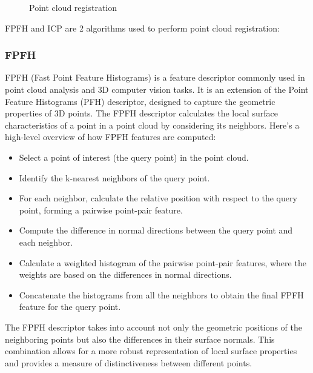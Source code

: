 \documentclass{article}
\begin{document}
	\begin{figure}[H]
		\centering
		\caption{Point cloud registration}
		\label{fig:pointcloud-align}
	\end{figure}
	
	FPFH and ICP are 2 algorithms used to perform point cloud registration:
	
	\subsubsection{FPFH}
	
	FPFH (Fast Point Feature Histograms) is a feature descriptor commonly used in point cloud analysis and 3D computer vision tasks. It is an extension of the Point Feature Histograms (PFH) descriptor, designed to capture the geometric properties of 3D points. The FPFH descriptor calculates the local surface characteristics of a point in a point cloud by considering its neighbors. Here's a high-level overview of how FPFH features are computed:
	\begin{itemize}
		\item Select a point of interest (the query point) in the point cloud.
		\item Identify the k-nearest neighbors of the query point.
		\item For each neighbor, calculate the relative position with respect to the query point, forming a pairwise point-pair feature.
		\item Compute the difference in normal directions between the query point and each neighbor.
		\item Calculate a weighted histogram of the pairwise point-pair features, where the weights are based on the differences in normal directions.
		\item Concatenate the histograms from all the neighbors to obtain the final FPFH feature for the query point.
	\end{itemize}
	
	The FPFH descriptor takes into account not only the geometric positions of the neighboring points but also the differences in their surface normals. This combination allows for a more robust representation of local surface properties and provides a measure of distinctiveness between different points.
	
\end{document}
